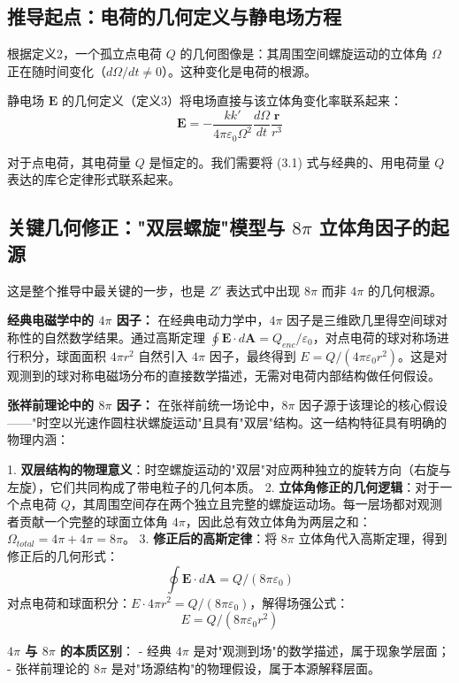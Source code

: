 \documentclass[a4paper,12pt]{article}
\theoremstyle{plain}
\renewcommand{\vec}[1]{\bm{#1}}
\begin{document}
\subsection{推导起点：电荷的几何定义与静电场方程}
根据定义2，一个孤立点电荷 $Q$ 的几何图像是：其周围空间螺旋运动的立体角 $\Omega$ 正在随时间变化（$d\Omega/dt \neq 0$）。这种变化是电荷的根源。

静电场 $\vec{E}$ 的几何定义（定义3）将电场直接与该立体角变化率联系起来：
$$\vec{E} = -\frac{k k'}{4\pi\varepsilon_0 \Omega^2} \frac{d\Omega}{dt} \frac{\vec{r}}{r^3} \tag{3.1}$$ 

对于点电荷，其电荷量 $Q$ 是恒定的。我们需要将 (3.1) 式与经典的、用电荷量 $Q$ 表达的库仑定律形式联系起来。

\subsection{关键几何修正："双层螺旋"模型与 $8\pi$ 立体角因子的起源}
这是整个推导中最关键的一步，也是 $Z'$ 表达式中出现 $8\pi$ 而非 $4\pi$ 的几何根源。

\textbf{经典电磁学中的 $4\pi$ 因子：}
在经典电动力学中，$4\pi$ 因子是三维欧几里得空间球对称性的自然数学结果。通过高斯定理 $\oint \vec{E} \cdot d\vec{A} = Q_{enc}/\varepsilon_0$，对点电荷的球对称场进行积分，球面面积 $4\pi r^2$ 自然引入 $4\pi$ 因子，最终得到 $E = Q/(4\pi\varepsilon_0 r^2)$。这是对观测到的球对称电磁场分布的直接数学描述，无需对电荷内部结构做任何假设。

\textbf{张祥前理论中的 $8\pi$ 因子：}
在张祥前统一场论中，$8\pi$ 因子源于该理论的核心假设——"时空以光速作圆柱状螺旋运动"且具有"双层"结构。这一结构特征具有明确的物理内涵：

1. \textbf{双层结构的物理意义}：时空螺旋运动的"双层"对应两种独立的旋转方向（右旋与左旋），它们共同构成了带电粒子的几何本质。
2. \textbf{立体角修正的几何逻辑}：对于一个点电荷 $Q$，其周围空间存在两个独立且完整的螺旋运动场。每一层场都对观测者贡献一个完整的球面立体角 $4\pi$，因此总有效立体角为两层之和：$\Omega_{total} = 4\pi + 4\pi = 8\pi$。
3. \textbf{修正后的高斯定律}：将 $8\pi$ 立体角代入高斯定理，得到修正后的几何形式：
   $$\oint \vec{E} \cdot d\vec{A} = Q / (8\pi\varepsilon_0) \tag{3.2}$$
   对点电荷和球面积分：$E \cdot 4\pi r^2 = Q / (8\pi\varepsilon_0)$，解得场强公式：
   $$E = Q / (8\pi\varepsilon_0 r^2) \tag{3.3}$$

\textbf{$4\pi$ 与 $8\pi$ 的本质区别}：
- 经典 $4\pi$ 是对"观测到场"的数学描述，属于现象学层面；
- 张祥前理论的 $8\pi$ 是对"场源结构"的物理假设，属于本源解释层面。
\end{document}
